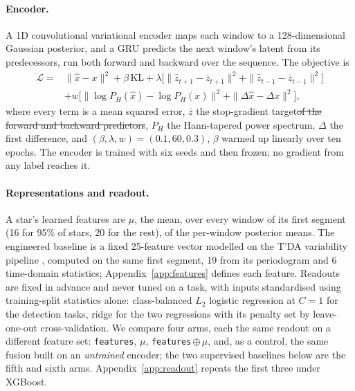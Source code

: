 \documentclass{article}
\makeatletter
\providecommand{\DIFdeltex}[1]{{\protect\color{red}\sout{#1}}} %
\providecommand{\DIFdelbegin}{} %
\providecommand{\DIFdelend}{} %
\providecommand{\DIFdel}[1]{\texorpdfstring{\DIFdeltex{#1}}{}} %
\providecommand{\DIFscaledelfig}{0.5}
\newlength{\DIFdelgraphicswidth} %
\newlength{\DIFdelgraphicsheight} %
\providecommand{\DIFdelincludegraphics}[2][]{%
\sbox{\DIFdelgraphicsbox}{\DIFOincludegraphics[#1]{#2}}%
\settoboxwidth{\DIFdelgraphicswidth}{\DIFdelgraphicsbox} %
\settoboxtotalheight{\DIFdelgraphicsheight}{\DIFdelgraphicsbox} %
\scalebox{\DIFscaledelfig}{%
\parbox[b]{\DIFdelgraphicswidth}{\usebox{\DIFdelgraphicsbox}\\[-\baselineskip] \rule{\DIFdelgraphicswidth}{0em}}\llap{\resizebox{\DIFdelgraphicswidth}{\DIFdelgraphicsheight}{%
\setlength{\unitlength}{\DIFdelgraphicswidth}%
\begin{picture}(1,1)%
\thicklines\linethickness{2pt} %
{\color[rgb]{1,0,0}\put(0,0){\framebox(1,1){}}}%
{\color[rgb]{1,0,0}\put(0,0){\line( 1,1){1}}}%
{\color[rgb]{1,0,0}\put(0,1){\line(1,-1){1}}}%
\end{picture}%
}\hspace*{3pt}}} %
} %
\DeclareRobustCommand{\DIFdelbegin}{\DIFOdelbegin \let\includegraphics\DIFdelincludegraphics} %
\DeclareRobustCommand{\DIFdelend}{\DIFOaddend \let\includegraphics\DIFOincludegraphics} %
\let\sout@orig\sout %
\renewcommand{\sout}[1]{\ifmmode\text{\sout@orig{\ensuremath{#1}}}\else\sout@orig{#1}\fi} %
\makeatother
\begin{document}
\paragraph{Encoder.} A 1D convolutional variational encoder \citep{kingma2014} maps each window to a
128-dimensional Gaussian posterior, and a GRU \citep{cho2014} predicts the next window's latent from
its predecessors, run both forward and backward over the sequence. The objective is
\begin{align*}
\mathcal{L} = {} & \|\hat{x}-x\|^{2} + \beta\,\mathrm{KL}
+ \lambda\big[\|\hat{z}_{t+1}-\bar{z}_{t+1}\|^{2} + \|\hat{z}_{t-1}-\bar{z}_{t-1}\|^{2}\big] \\
& + w\big[\|\log P_{H}(\hat{x})-\log P_{H}(x)\|^{2} + \|\Delta\hat{x}-\Delta x\|^{2}\big],
\end{align*}
where every term is a mean squared error, $\bar{z}$ the stop-gradient target\DIFdelbegin \DIFdel{of the forward and
backward predictors}\DIFdelend , $P_{H}$ the Hann-tapered power spectrum, $\Delta$ the first difference, and
$(\beta,\lambda,w) = (0.1, 60, 0.3)$, $\beta$ warmed up linearly over ten epochs. The encoder is trained with six seeds and then frozen; no gradient from any label reaches
it.

\paragraph{Representations and readout.} A star's learned features are $\mu$, the mean, over every
window of its first segment (16 for 95\% of stars, 20 for the rest), of the per-window posterior
means. The engineered baseline is a fixed 25-feature vector modelled on the T'DA variability pipeline
\citep{audenaert2021}, computed on the same first segment, 19 from its periodogram and 6 time-domain statistics; Appendix~\ref{app:features} defines each feature. Readouts are fixed in advance and never
tuned on a task, with inputs standardised using training-split statistics alone: class-balanced $L_{2}$ logistic regression
at $C = 1$ for the detection tasks, ridge for the two regressions with its penalty set by leave-one-out
cross-validation. We compare four
arms, each the same readout on a different feature set: \texttt{features}, $\mu$,
\texttt{features}\,$\oplus\,\mu$, and, as a control, the same fusion built on an \emph{untrained}
encoder; the two supervised baselines below are the fifth and sixth arms.
Appendix~\ref{app:readout} repeats the first three under XGBoost.
\end{document}
